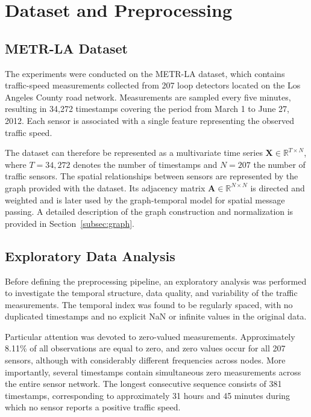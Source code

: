 \section{Dataset and Preprocessing}
\label{sec:data}

\subsection{METR-LA Dataset}
\label{subsec:dataset}

The experiments were conducted on the METR-LA dataset, which contains
traffic-speed measurements collected from 207 loop detectors located on the
Los Angeles County road network. Measurements are sampled every five minutes,
resulting in 34,272 timestamps covering the period from March 1 to June 27,
2012. Each sensor is associated with a single feature representing the
observed traffic speed.

The dataset can therefore be represented as a multivariate time series
$\mathbf{X} \in \mathbb{R}^{T \times N}$, where $T=34{,}272$ denotes the
number of timestamps and $N=207$ the number of traffic sensors. The spatial
relationships between sensors are represented by the graph provided with the
dataset. Its adjacency matrix $\mathbf{A} \in \mathbb{R}^{N \times N}$ is
directed and weighted and is later used by the graph-temporal model for
spatial message passing. A detailed description of the graph construction and
normalization is provided in Section~\ref{subsec:graph}.


\subsection{Exploratory Data Analysis}
\label{subsec:eda}

Before defining the preprocessing pipeline, an exploratory analysis was
performed to investigate the temporal structure, data quality, and variability
of the traffic measurements. The temporal index was found to be regularly
spaced, with no duplicated timestamps and no explicit NaN or infinite values
in the original data.

Particular attention was devoted to zero-valued measurements. Approximately
8.11\% of all observations are equal to zero, and zero values occur for all
207 sensors, although with considerably different frequencies across nodes.
More importantly, several timestamps contain simultaneous zero measurements
across the entire sensor network. The longest consecutive sequence consists
of 381 timestamps, corresponding to approximately 31 hours and 45 minutes
during which no sensor reports a positive traffic speed.

